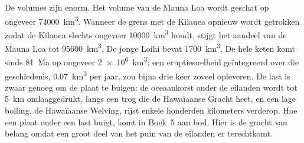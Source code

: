 De volumes zijn enorm. Het volume van de Mauna Loa wordt geschat op ongeveer \qty{74000}{km^3}. Wanneer de grens met de Kilauea opnieuw wordt getrokken zodat de Kilauea slechts ongeveer
\qty{10000}{km^3} houdt, stijgt het aandeel van de Mauna Loa tot \qty{95600}{km^3}. De jonge Loihi bevat
\qty{1700}{km^3}. De hele keten komt sinds \qty{81}{Ma} op ongeveer
\qty{2e6}{km^3}; een eruptiesnelheid geïntegreerd over die geschiedenis, \qty{0.07}{km^3} per jaar, zou bijna drie keer zoveel opleveren. De last is zwaar genoeg om de
plaat te buigen: de oceaankorst onder de eilanden wordt tot \qty{5}{km} omlaaggedrukt, langs een
trog die de Hawaïaanse Gracht heet, en een lage bolling, de Hawaïaanse Welving, rijst enkele honderden
kilometers verderop. Hoe een plaat onder een last buigt, komt in Boek~5 aan bod. Hier
is de gracht van belang omdat een groot deel van het puin van de eilanden er terechtkomt.

